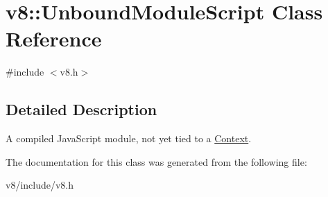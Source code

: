 \hypertarget{classv8_1_1UnboundModuleScript}{}\section{v8\+:\+:Unbound\+Module\+Script Class Reference}
\label{classv8_1_1UnboundModuleScript}


{\ttfamily \#include $<$v8.\+h$>$}



\subsection{Detailed Description}
A compiled Java\+Script module, not yet tied to a \mbox{\hyperlink{classv8_1_1Context}{Context}}. 

The documentation for this class was generated from the following file\+:\begin{DoxyCompactItemize}
\item 
v8/include/v8.\+h\end{DoxyCompactItemize}
